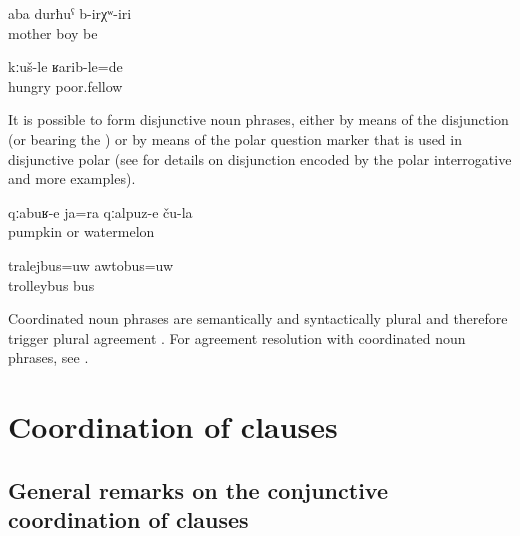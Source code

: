 \begin{exe}
	\ex	\label{ex:There were mother and son}
	\gll	aba	durħuˁ	b-irχʷ-iri\\
		mother	boy	be\\
	\glt	{}

	\ex	\label{ex:‎They were hungry and poor}
	\gll	kːuš-le	ʁarib-le=de\\
		hungry	poor.fellow\\
	\glt	{}
\end{exe}

It is possible to form disjunctive noun phrases, either by means of the disjunction  (or  bearing the )  or by means of the polar question marker   that is used in disjunctive polar  (see  for details on disjunction encoded by the polar interrogative  and more examples).

\begin{exe}
	\ex	\label{ex:their pumpkins or watermelons}
	\gll	qːabuʁ-e	ja=ra	qːalpuz-e	ču-la\\
		pumpkin	or	watermelon	\\
	\glt	{}

	\ex	\label{ex:‎a trolleybus or a bus}
	\gll	tralejbus=uw		awtobus=uw	\\
		trolleybus	bus\\
	\glt	{}
\end{exe}

Coordinated noun phrases are semantically and syntactically plural and therefore trigger plural agreement . For agreement resolution with coordinated noun phrases, see .



\section{Coordination of clauses}
\label{sec:Coordination of clauses other phrases}

\subsection{General remarks on the conjunctive coordination of clauses}
\label{ssec:General remarks on the conjunctive coordination of clauses}


